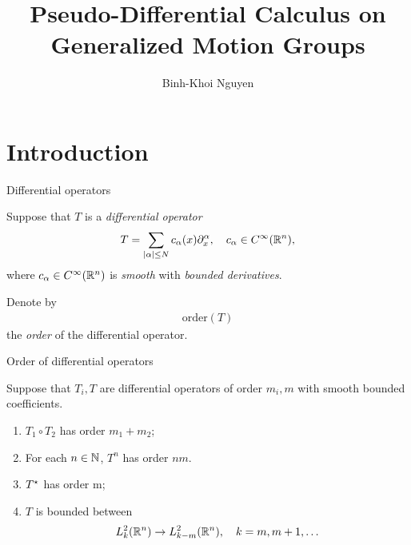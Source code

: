 \documentclass{beamer}
\title{Pseudo-Differential Calculus on Generalized Motion Groups}
\author{Binh-Khoi Nguyen}
\begin{document}
\maketitle

\section{Introduction}

\renewcommand \Group {\R^n}

\begin{frame}
    {Differential operators}

    Suppose that $T$ is a \emph{differential operator}
    \begin{align*}
        T =
        \sum_{\abs \alpha \leq N}
        c_\alpha(x)
        \iD {x^\alpha},
        \quad
        c_\alpha \in \SmoothFunctions {\R^n},
    \end{align*}
    where $c_\alpha \in {C^\infty(\mathbb{R}^n)}$ is \emph{smooth} with \emph{bounded derivatives}.

    \pause

    Denote by
    \begin{align*}
        \mathrm{order}(T)
    \end{align*}
    the \emph{order} of the differential operator.
\end{frame}

\begin{frame}
    {Order of differential operators}

    Suppose that $T_i, T$ are differential operators
    of order $m_i, m$
    with smooth bounded coefficients.

    \begin{enumerate}
        \item $T_1 \circ T_2$ has order $m_1 + m_2$;
            \pause
        \item For each $n \in \mathbb{N}$, $T^n$ has order $n m$.
            \pause
        \item ${T}^\star$ has order m;
            \pause
        \item $T$ is bounded between
            \begin{align*}
                \Sobolev k \to \Sobolev {k - m},
                \quad k = m, m + 1, \dots
            \end{align*}
    \end{enumerate}
\end{frame}
\end{document}
